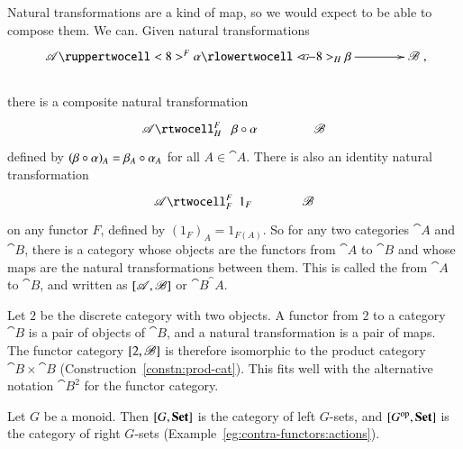 \begin{constn}  
\label{constn:comp-nat}
Natural transformations are a kind of map, so we would expect to be able to
compose%
%
%
them.  We can.  Given natural transformations
% 
\vspace{-2ex}
\[
\xymatrix@C+1.5em{
\cat{A} 
\ruppertwocell<8>^F{\alpha}
\ar[r]|G 
\rlowertwocell<-8>_H{\beta}
&
\cat{B}
},
\]
\vspace{-3ex}\\
% 
there is a composite natural transformation
\[
\xymatrix@C+1.5em{
\cat{A} \rtwocell^F_H{\hspace{.8em}\beta\of\alpha} &\cat{B}
}%
%
\ntn{of-nt}
%
\]
defined by $(\beta\mathbin{\circ}\alpha)_A = \beta_A \mathbin{\circ} \alpha_A$ for all $A \in
\cat{A}$.  There is also an identity%
%
%
natural transformation
\[
\xymatrix@C+1em{
\cat{A} \rtwocell^F_F{\hspace{.5em}1_F} &\cat{B}
}%
%
\ntn{id-nt}
%
\]
on any functor $F$, defined by $(1_F)_A = 1_{F(A)}$.  So for any two
categories $\cat{A}$ and $\cat{B}$, there is a category whose objects are
the functors from $\cat{A}$ to $\cat{B}$ and whose maps are the natural
transformations between them.  This is called the  from $\cat{A}$ to $\cat{B}$, and written as
$[\mathscr{A},\mathscr{B}]$%
%
%
 or
$\cat{B}^\cat{A}$.%
%
%
\end{constn}

\begin{example}        
Let $2$%
%
%
be the discrete%
%
%
category with two objects.  A functor from $2$ to a category $\cat{B}$ is a
pair of objects of $\cat{B}$, and a natural transformation is a pair of
maps.  The functor category $[2,\mathscr{B}]$ is therefore isomorphic
to the product category $\cat{B} \times \cat{B}$
(Construction~\ref{constn:prod-cat}).  This fits well with the alternative
notation $\cat{B}^2$ for the functor category.
\end{example}

\begin{example} 
Let $G$ be a monoid.%
%
%
Then $[G,\mathbf{Set}]$%
%
%
is the category of left $G$-sets, and $[G^{\mathrm{op}},\mathbf{Set}]$ is the
category of right $G$-sets (Example~\ref{eg:contra-functors:actions}).
\end{example}


